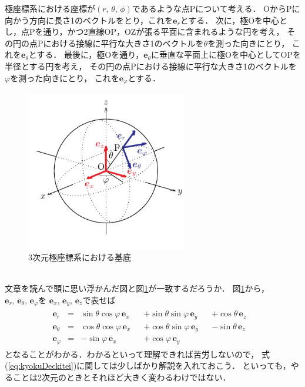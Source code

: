 極座標系における座標が$(r, \, \theta, \, \phi)$であるような点Pについて考える．
OからPに向かう方向に長さ1のベクトルをとり，これを$\bm{e}_r$とする．
次に，極Oを中心とし，点Pを通り，かつ2直線OP，OZが張る平面に含まれるような円を考え，
その円の点Pにおける接線に平行な大きさ1のベクトルを$\theta$を測った向きにとり，
これを$\bm{e}_\theta$とする．
最後に，極Oを通り，$\bm{e}_\theta$に垂直な平面上に極Oを中心としてOPを半径とする円を考え，
その円の点Pにおける接線に平行な大きさ1のベクトルを$\varphi$を測った向きにとり，
これを$\bm{e}_\varphi$とする．
\begin{figure}[h]
 \begin{center}
 \includegraphics[width=7cm]{picture/vecter30.pdf}
 \caption{3次元極座標系における基底}
\label{fig:3dkyokukitei}
 \end{center}
\end{figure} \\
文章を読んで頭に思い浮かんだ図と図\ref{fig:3dkyokukitei}が一致するだろうか．
図\ref{fig:3dkyokukitei}から，$\bm{e}_r, \, \bm{e}_\theta, \, \bm{e}_\varphi$を
$\bm{e}_x, \, \bm{e}_y, \, \bm{e}_z$で表せば
\begin{align}
\begin{aligned}
\bm{e}_r & = & \sin \theta \cos \varphi \, \bm{e}_x & & + \sin \theta \sin \varphi \, \bm{e}_y &
& + \cos \theta \, \bm{e}_z & \\
\bm{e}_\theta & = & \cos \theta \cos \varphi \, \bm{e}_x & & + \cos \theta \sin \varphi \, \bm{e}_y & 
& -  \sin \theta \,  \bm{e}_z & \\
\bm{e}_\varphi & = & - \sin \varphi \, \bm{e}_x & & + \cos \varphi \, \bm{e}_y &
\label{eq:kyokuDeckitei}
\end{aligned}
\end{align}
となることがわかる．わかるといって理解できれば苦労しないので，
式(\ref{eq:kyokuDeckitei})に関しては少しばかり解説を入れておこう．
といっても，やることは2次元のときとそれほど大きく変わるわけではない．

